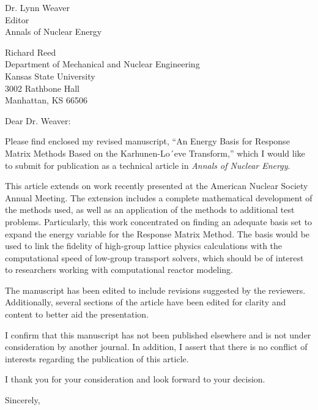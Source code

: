 \documentclass[11pt]{letter} %
\begin{document}
\longindentation=0pt                       %
\let\raggedleft\raggedright                %
 

\begin{letter}{Dr. Lynn Weaver\\
Editor\\
Annals of Nuclear Energy}

\begin{flushright}
\hfill Richard Reed \\
\hfill Department of Mechanical and Nuclear Engineering \\
\hfill Kansas State University \\ 
\hfill 3002 Rathbone Hall \\
\hfill Manhattan, KS 66506
\end{flushright} 

 
\opening{Dear Dr. Weaver:} 
 
\noindent Please find enclosed my revised manuscript, 
``An Energy Basis for Response Matrix Methods Based on the Karhunen-Lo´eve Transform,'' which I would like 
to submit for publication as a technical article in 
 {\it Annals of Nuclear Energy}.
 
\noindent This article extends on work recently presented at the American
Nuclear Society Annual Meeting.  The extension includes a complete mathematical
development of the methods used, as well as an application of the methods to
additional test problems.  Particularly, this work concentrated on finding an
adequate basis set to expand the energy variable for the Response Matrix
Method.  The basis would be used to link the fidelity of high-group lattice 
physics calculations with the computational speed of low-group transport solvers,
which should be of interest to researchers working with computational
reactor modeling.

\noindent The manuscript has been edited to include revisions suggested by the 
reviewers.  Additionally, several sections of the article have been edited for 
clarity and content to better aid the presentation.

\noindent I confirm that this manuscript has not been published elsewhere 
and is not under consideration by another journal.  In addition, 
I assert that there is no conflict of interests regarding 
the publication of this article.

\noindent I thank you for your consideration and look forward to your 
decision.

\closing{Sincerely,\\
} 
  
\end{letter}
 
\end{document}
